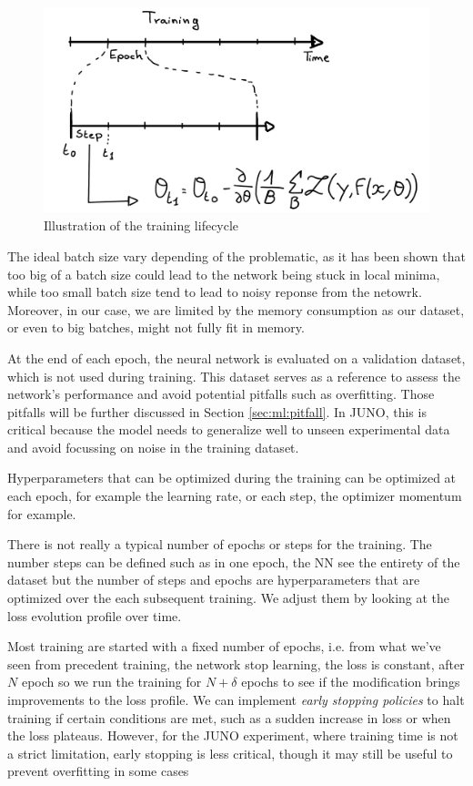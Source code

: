 \documentclass[../main.tex]{subfiles}
\begin{document}
\begin{figure}[ht]
  \centering
  \includegraphics[height=6cm]{images/ml/lifecycle.jpg}
  \caption{Illustration of the training lifecycle}
  \label{fig:ml:lifecycle}
\end{figure}

The ideal batch size vary depending of the problematic, as it has been shown that too big of a batch size could lead to the network being stuck in local minima, while too small batch size tend to lead to noisy reponse from the netowrk. Moreover, in our case, we are limited by the memory consumption as our dataset, or even to big batches, might not fully fit in memory.

At the end of each epoch, the neural network is evaluated on a validation dataset, which is not used during training. This dataset serves as a reference to assess the network's performance and avoid potential pitfalls such as overfitting. Those pitfalls will be further discussed in Section \ref{sec:ml:pitfall}. In JUNO, this is critical because the model needs to generalize well to unseen experimental data and avoid focussing on noise in the training dataset.

Hyperparameters that can be optimized during the training can be optimized at each epoch, for example the learning rate, or each step, the optimizer momentum for example.

There is not really a typical number of epochs or steps for the training. The number steps can be defined such as in one epoch, the NN see the entirety of the dataset but the number of steps and epochs are hyperparameters that are optimized over the each subsequent training. We adjust them by looking at the loss evolution profile over time.

Most training are started with a fixed number of epochs, i.e. from what we've seen from precedent training, the network stop learning, the loss is constant, after $N$ epoch so we run the training for $N+\delta$ epochs to see if the modification brings improvements to the loss profile.
We can implement \textit{early stopping policies} to halt training if certain conditions are met, such as a sudden increase in loss or when the loss plateaus. However, for the JUNO experiment, where training time is not a strict limitation, early stopping is less critical, though it may still be useful to prevent overfitting in some cases
\end{document}
